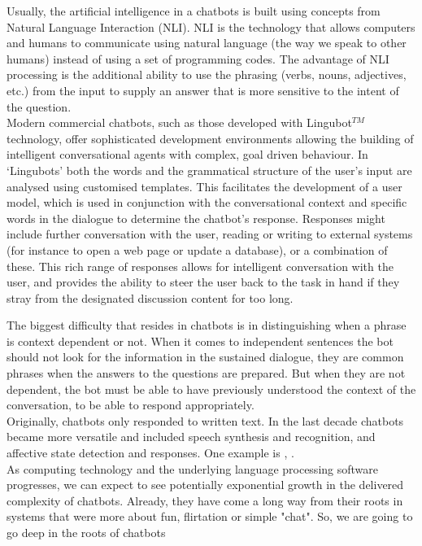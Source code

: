 \documentclass[12pt,twoside]{article}
\theoremstyle{plain}
\theoremstyle{definition}
\theoremstyle{remark}
\begin{document}
 Usually, the artificial intelligence in a chatbots is built using concepts from Natural Language Interaction (NLI). NLI is the technology that allows computers and humans to communicate using natural language (the way we speak to other humans) instead of using a set of programming codes. The advantage of NLI processing is the additional ability to use the phrasing (verbs, nouns, adjectives, etc.) from the input to supply an answer that is more sensitive to the intent of the question.\\
 
 Modern commercial chatbots, such as those developed with Lingubot$^{TM}$ \cite{lingubot2004creative} technology, offer sophisticated development environments allowing the building of intelligent conversational agents with complex, goal driven behaviour. In ‘Lingubots’ both the words and the grammatical structure of the user’s input are analysed using customised templates. This facilitates the development of a user model, which is used in conjunction with the conversational context and specific words in the dialogue to determine the chatbot’s response. Responses might include further conversation with the user, reading or writing to external systems (for instance to open a web page or update a database), or a combination of these. This rich range of responses allows for intelligent conversation with the user, and provides the ability to steer the user back to the task in hand if they stray from the designated discussion content for too long.  \\
 
\newpage
 
The biggest difficulty that resides in chatbots is in distinguishing when a phrase is context dependent or not. When it comes to independent sentences the bot should not look for the information in the sustained dialogue, they are common phrases when the answers to the questions are prepared. But when they are not dependent, the bot must be able to have previously understood the context of the conversation, to be able to respond appropriately.\\
 
	 Originally, chatbots only responded to written text. In the last decade chatbots became more versatile and included speech synthesis and recognition,
and affective state detection and responses. One example is ,\cite{curry2012implementation} .\\


As computing technology and the underlying language processing software progresses, we can expect to see potentially exponential growth in the delivered complexity of chatbots. Already, they have come a long way from their roots in systems that were more about fun, flirtation or simple "chat". So, we are going to go deep in the roots of chatbots\\
 
\end{document}
